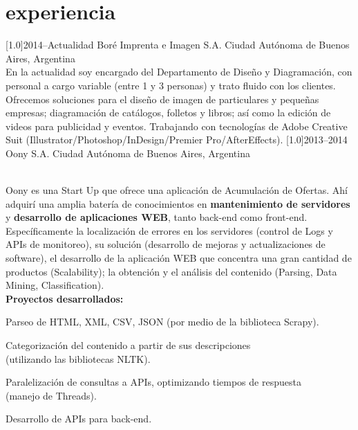 \documentclass[espanol]{cv-style}     %
\begin{document}
\section{experiencia}
  \vspace{-0.2cm}
\begin{entrylist}
\entry
  {\scalebox{.8}[1.0]{2014--Actualidad}}
  {Boré Imprenta e Imagen S.A.}
  {Ciudad Autónoma de Buenos Aires, Argentina}
  {\\
  En la actualidad soy encargado del Departamento de Diseño y Diagramación, con personal a cargo variable (entre 1 y 3 personas) y trato fluido con los clientes. Ofrecemos soluciones para el diseño de imagen de particulares y pequeñas empresas; diagramación de catálogos, folletos y libros; así como la edición de videos para publicidad y eventos. Trabajando con tecnologías de Adobe Creative Suit (Illustrator/Photoshop/InDesign/Premier Pro/AfterEffects).}
\vspace{-0.3cm}
\entry
  {\scalebox{.8}[1.0]{2013--2014}}
  {Oony S.A.}
  {Ciudad Autónoma de Buenos Aires, Argentina}
  {\\
  Oony es una Start Up que ofrece una aplicación de Acumulación de Ofertas. Ahí adquirí una amplia batería de conocimientos en \textbf{mantenimiento de servidores} y \textbf{desarrollo de aplicaciones WEB}, tanto back-end como front-end. Específicamente la localización de errores en los servidores (control de Logs y APIs de monitoreo), su solución (desarrollo de mejoras y actualizaciones de software), el desarrollo de la aplicación WEB que concentra una gran cantidad de productos (Scalability); la obtención y el análisis del contenido (Parsing, Data Mining, Classification).\\
  \textbf{Proyectos desarrollados:}
  \begin{itemize}\small{
    \item Parseo de HTML, XML, CSV, JSON (por medio de la biblioteca Scrapy).
    \item Categorización del contenido a partir de sus descripciones\\
    (utilizando las bibliotecas NLTK).
    \item Paralelización de consultas a APIs, optimizando tiempos de respuesta\\
    (manejo de Threads).
    \item Desarrollo de APIs para back-end.}
  \end{itemize}}
\end{entrylist}
\end{document}
